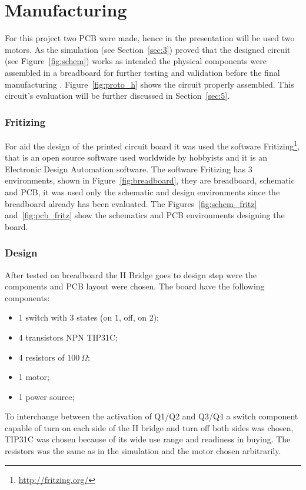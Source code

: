 \section{\textbf{Manufacturing}}\label{sec:4}
    For this project two PCB were made, hence in the presentation will be used two motors.
    As the simulation (see Section~\ref{sec:3}) proved that the designed circuit (see Figure~\ref{fig:schem}) works as intended the physical components were assembled in a breadboard for further testing and validation before the final manufacturing . Figure~\ref{fig:proto_h} shows the circuit properly assembled. This circuit's evaluation will be further discussed in Section~\ref{sec:5}.

    \subsubsection{Fritizing} %
    \label{ssub:fritizing}
        For aid the design of the printed circuit board it was used the software Fritizing\footnote{\url{http://fritzing.org/}}, that is an open source software used worldwide by hobbyists and it is an Electronic Design Automation software.
        The software Fritizing has 3 environments, shown in Figure~\ref{fig:breadboard}, they are breadboard, schematic and PCB, it was used only the schematic and design environments since the breadboard already has been evaluated. The Figures~\ref{fig:schem_fritz} and~\ref{fig:pcb_fritz} show the schematics and PCB environments designing the board.

    \subsubsection{Design} %
    \label{ssub:design}
        After tested on breadboard the H Bridge goes to design step were the components and PCB layout were chosen. The board have the following components:
        \begin{itemize}
            \item 1 switch with 3 states (on 1, off, on 2);
            \item 4 transistors NPN TIP31C;
            \item 4 resistors of $100\:\Omega$;
            \item 1 motor;
            \item 1 power source;
        \end{itemize}
        To interchange between the activation of Q1/Q2 and Q3/Q4 a switch component capable of turn on each side of the H bridge and turn off both sides was chosen, TIP31C was chosen because of its wide use range and readiness in buying. The resistors was the same as in the simulation and the motor chosen arbitrarily.

